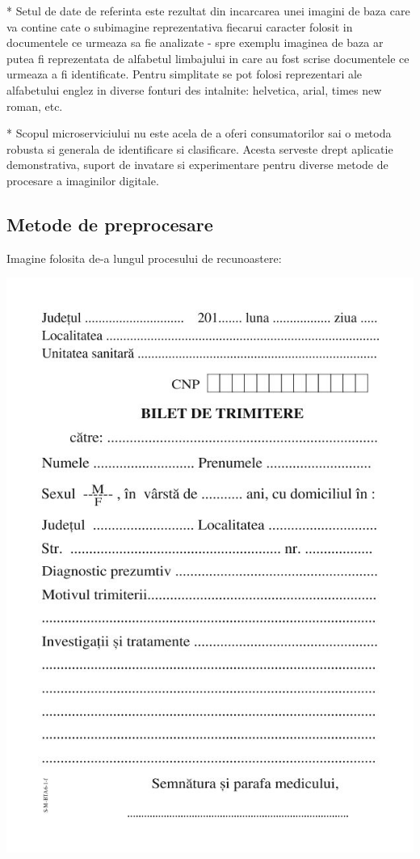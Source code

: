 \documentclass[10pt]{article}
\begin{document}
\> * Setul de date de referinta este rezultat din incarcarea unei imagini de baza care va contine cate o subimagine reprezentativa
fiecarui caracter folosit in documentele ce urmeaza sa fie analizate - spre exemplu imaginea de baza ar putea fi reprezentata de
alfabetul limbajului in care au fost scrise documentele ce urmeaza a fi identificate. Pentru simplitate se pot folosi reprezentari ale alfabetului englez
in diverse fonturi des intalnite: helvetica, arial, times new roman, etc.

\> * Scopul microserviciului nu este acela de a oferi consumatorilor sai o metoda robusta si generala de identificare si clasificare. Acesta serveste
drept aplicatie demonstrativa, suport de invatare si experimentare pentru diverse metode de procesare a imaginilor digitale.

\newpage

\subsection{Metode de preprocesare}

Imagine folosita de-a lungul procesului de recunoastere:

\begin{center}

  \includegraphics[scale=0.7]{imagine-analizata.jpg}
  
\end{center}
\end{document}

